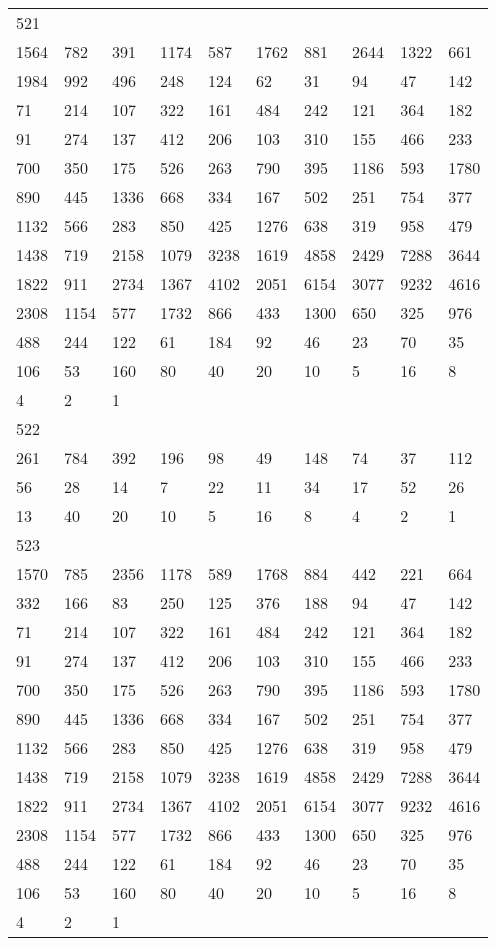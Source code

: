 \begin{longtable}{*{10}{l}}
521&&&&&&&&&\\
1564& 782& 391& 1174& 587& 1762& 881& 2644& 1322& 661\\
1984& 992& 496& 248& 124& 62& 31& 94& 47& 142\\
71& 214& 107& 322& 161& 484& 242& 121& 364& 182\\
91& 274& 137& 412& 206& 103& 310& 155& 466& 233\\
700& 350& 175& 526& 263& 790& 395& 1186& 593& 1780\\
890& 445& 1336& 668& 334& 167& 502& 251& 754& 377\\
1132& 566& 283& 850& 425& 1276& 638& 319& 958& 479\\
1438& 719& 2158& 1079& 3238& 1619& 4858& 2429& 7288& 3644\\
1822& 911& 2734& 1367& 4102& 2051& 6154& 3077& 9232& 4616\\
2308& 1154& 577& 1732& 866& 433& 1300& 650& 325& 976\\
488& 244& 122& 61& 184& 92& 46& 23& 70& 35\\
106& 53& 160& 80& 40& 20& 10& 5& 16& 8\\
4& 2& 1& \\

522&&&&&&&&&\\
261& 784& 392& 196& 98& 49& 148& 74& 37& 112\\
56& 28& 14& 7& 22& 11& 34& 17& 52& 26\\
13& 40& 20& 10& 5& 16& 8& 4& 2& 1\\

523&&&&&&&&&\\
1570& 785& 2356& 1178& 589& 1768& 884& 442& 221& 664\\
332& 166& 83& 250& 125& 376& 188& 94& 47& 142\\
71& 214& 107& 322& 161& 484& 242& 121& 364& 182\\
91& 274& 137& 412& 206& 103& 310& 155& 466& 233\\
700& 350& 175& 526& 263& 790& 395& 1186& 593& 1780\\
890& 445& 1336& 668& 334& 167& 502& 251& 754& 377\\
1132& 566& 283& 850& 425& 1276& 638& 319& 958& 479\\
1438& 719& 2158& 1079& 3238& 1619& 4858& 2429& 7288& 3644\\
1822& 911& 2734& 1367& 4102& 2051& 6154& 3077& 9232& 4616\\
2308& 1154& 577& 1732& 866& 433& 1300& 650& 325& 976\\
488& 244& 122& 61& 184& 92& 46& 23& 70& 35\\
106& 53& 160& 80& 40& 20& 10& 5& 16& 8\\
4& 2& 1& \\


\end{longtable}
